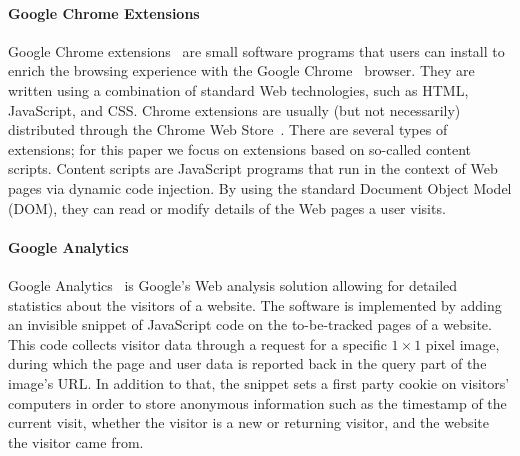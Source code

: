\documentclass{acm_proc_article-sp}
\begin{document}
\paragraph{Google Chrome Extensions}
Google Chrome extensions~\cite{chromeextensions} are small software programs that users can install to enrich the browsing experience with the Google Chrome~\cite{chrome} browser. They are written using a combination of standard Web technologies, such as HTML, JavaScript, and CSS. Chrome extensions are usually (but not necessarily) distributed through the Chrome Web Store~\cite{chromewebstore}. There are several types of extensions; for this paper we focus on extensions based on so-called content scripts. Content scripts are JavaScript programs that run in the context of Web pages via dynamic code injection. By using the standard Document Object Model (DOM), they can read or modify details of the Web pages a user visits.

\paragraph{Google Analytics}
Google Analytics~\cite{googleanalytics} is Google's Web analysis solution allowing for detailed statistics about the visitors of a website. The software is implemented by adding an invisible snippet of JavaScript code on the to-be-tracked pages of a website. This code collects visitor data through a request for a specific $1 \times 1$ pixel image, during which the page and user data is reported back in the query part of the image's URL. In addition to that, the snippet sets a first party cookie on visitors' computers in order to store anonymous information such as the timestamp of the current visit, whether the visitor is a new or returning visitor, and the website the visitor came from.
\end{document}
